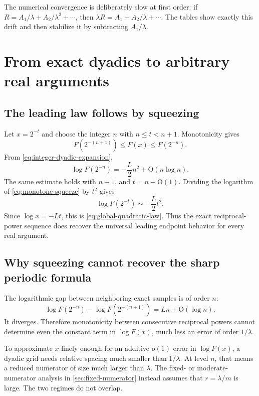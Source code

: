 \documentclass[11pt,oneside]{article}
\theoremstyle{definition}
\theoremstyle{remark}
\newcommand{\bigO}{\mathrm O}
\begin{document}
The numerical convergence is deliberately slow at first order: if
$R=A_1/\lambda+A_2/\lambda^2+\cdots$, then
$\lambda R=A_1+A_2/\lambda+\cdots$.  The tables show exactly this drift and then stabilize it by subtracting $A_1/\lambda$.

\section{From exact dyadics to arbitrary real arguments}
\label{sec:dedydadicization}

\subsection{The leading law follows by squeezing}

Let $x=2^{-t}$ and choose the integer $n$ with
$n\le t<n+1$.  Monotonicity gives
\begin{equation}
 F(2^{-(n+1)})\le F(x)\le F(2^{-n}).
\label{eq:monotone-squeeze}
\end{equation}
From \eqref{eq:integer-dyadic-expansion},
\begin{equation}
 \log F(2^{-n})=-\frac L2n^2+\bigO(n\log n).
\label{eq:dyadic-leading-bound}
\end{equation}
The same estimate holds with $n+1$, and $t=n+\bigO(1)$.  Dividing the logarithm of
\eqref{eq:monotone-squeeze} by $t^2$ gives
\begin{equation}
 \log F(2^{-t})\sim-\frac L2t^2.
\end{equation}
Since $\log x=-Lt$, this is \eqref{eq:global-quadratic-law}.  Thus the exact reciprocal-power sequence does recover the universal leading endpoint behavior for every real argument.

\subsection{Why squeezing cannot recover the sharp periodic formula}

The logarithmic gap between neighboring exact samples is of order $n$:
\begin{equation}
 \log F(2^{-n})-\log F(2^{-(n+1)})=Ln+\bigO(\log n).
\label{eq:neighbor-gap}
\end{equation}
It diverges.  Therefore monotonicity between consecutive reciprocal powers cannot determine even the constant term in $\log F(x)$, much less an error of order $1/\lambda$.

To approximate $x$ finely enough for an additive $o(1)$ error in $\log F(x)$, a dyadic grid needs relative spacing much smaller than $1/\lambda$.  At level $n$, that means a reduced numerator of size much larger than $\lambda$.  The fixed- or moderate-numerator analysis in \cref{sec:fixed-numerator} instead assumes that $r=\lambda/m$ is large.  The two regimes do not overlap.
\end{document}
